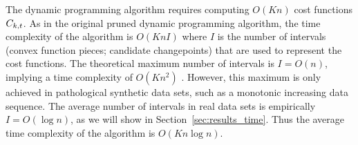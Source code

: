 \documentclass{article}
\begin{document}


The dynamic programming algorithm requires computing $O(Kn)$ cost
functions $C_{k,t}$. As in the original pruned dynamic programming
algorithm, the time complexity of the algorithm is $O(K n I)$ where
$I$ is the number of intervals (convex function pieces; candidate
changepoints) that are used to represent the cost functions. The
theoretical maximum number of intervals is $I=O(n)$, implying a time
complexity of $O(K n^2)$ \citep{pruned-dp-new}. However, this maximum
is only achieved in pathological synthetic data sets, such as a
monotonic increasing data sequence. The average number of intervals in
real data sets is empirically $I=O(\log n)$, as we will show in
Section~\ref{sec:results_time}. Thus the average time complexity of
the algorithm is $O(K n \log n)$.
\end{document}
